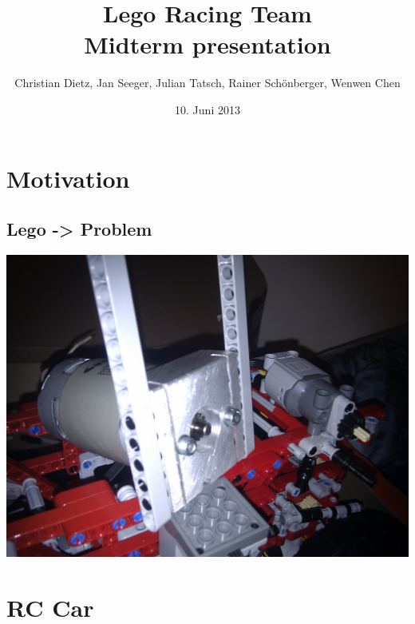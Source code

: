 \documentclass[pdf]{beamer}
\begin{document}
\title[Lego Racing Team]{Lego Racing Team\\\small{Midterm presentation}}
\author[...]{Christian Dietz, Jan Seeger, Julian Tatsch, Rainer Sch\"{o}nberger, Wenwen Chen\\}
\date{10. Juni 2013}

\subject{Midterm presentation}

\frame{
 \titlepage
}



\section{Motivation}
\subsection{Lego -> Problem}
\begin{frame}
  \begin{center}
  \includegraphics[width = \textwidth]{pics/raw/legomotor.jpg}
  \end{center}
\end{frame}

\section{RC Car}
\end{document}
